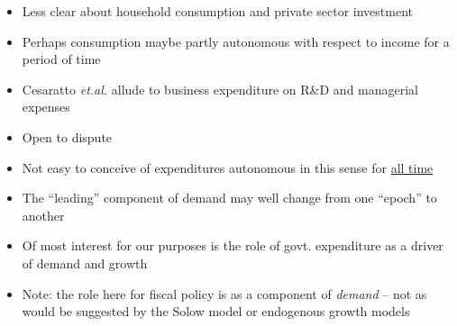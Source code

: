 \documentclass[a4paper,twoside]{article}
\numberwithin{equation}{section}
\numberwithin{figure}{section}
\begin{document}
\begin{itemize}
		\item Less clear about household consumption and private sector investment
		\item Perhaps consumption maybe partly autonomous with respect to income for a period of time
		\item Cesaratto \textit{et.al.} allude to business expenditure on R\&D and managerial expenses
		\item Open to dispute 
		\item Not easy to conceive of expenditures autonomous in this sense for \underline{all time}
		\item The ``leading'' component of demand may well change from one ``epoch'' to another
		\item Of most interest for our purposes is the role of govt. expenditure as a driver of demand and growth
		\item Note: the role here for fiscal policy is as a component of \textit{demand} -- not as would be suggested by the Solow model or endogenous growth models 
	\end{itemize}
\end{document}
